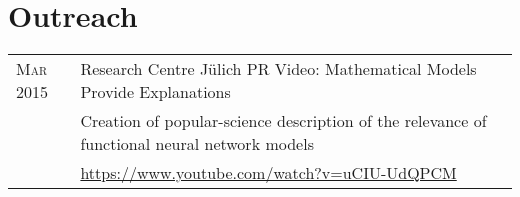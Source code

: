 \section{Outreach}
\begin{longtable}{>{\hfill}p{3.3cm}|p{12.0cm}}
  \textsc{Mar} 2015 & Research Centre J\"ulich PR Video: Mathematical Models Provide Explanations \\
                    & \footnotesize Creation of popular-science description of the relevance of functional neural network models \\
                    & \footnotesize \href{https://www.youtube.com/watch?v=uCIU-UdQPCM}{https://www.youtube.com/watch?v=uCIU-UdQPCM}
\end{longtable}